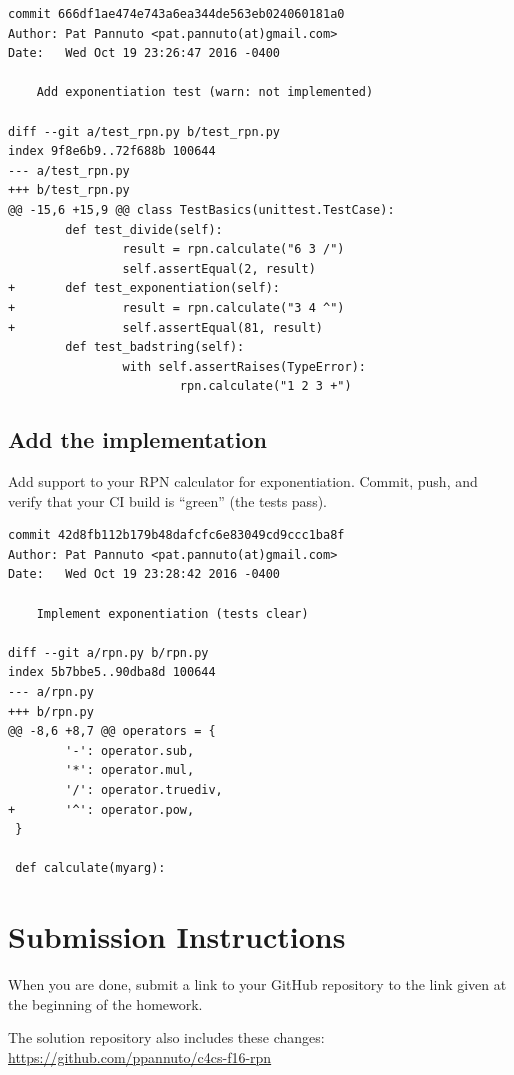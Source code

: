 \documentclass{article}
\begin{document}
{\color{violet}
\begin{lstlisting}
commit 666df1ae474e743a6ea344de563eb024060181a0
Author: Pat Pannuto <pat.pannuto(at)gmail.com>
Date:   Wed Oct 19 23:26:47 2016 -0400

    Add exponentiation test (warn: not implemented)

diff --git a/test_rpn.py b/test_rpn.py
index 9f8e6b9..72f688b 100644
--- a/test_rpn.py
+++ b/test_rpn.py
@@ -15,6 +15,9 @@ class TestBasics(unittest.TestCase):
        def test_divide(self):
                result = rpn.calculate("6 3 /")
                self.assertEqual(2, result)
+       def test_exponentiation(self):
+               result = rpn.calculate("3 4 ^")
+               self.assertEqual(81, result)
        def test_badstring(self):
                with self.assertRaises(TypeError):
                        rpn.calculate("1 2 3 +")
\end{lstlisting}
}

\subsection{Add the implementation}
Add support to your RPN calculator for exponentiation. Commit, push,
and verify that your CI build is ``green'' (the tests pass).


{\color{violet}
\begin{lstlisting}
commit 42d8fb112b179b48dafcfc6e83049cd9ccc1ba8f
Author: Pat Pannuto <pat.pannuto(at)gmail.com>
Date:   Wed Oct 19 23:28:42 2016 -0400

    Implement exponentiation (tests clear)

diff --git a/rpn.py b/rpn.py
index 5b7bbe5..90dba8d 100644
--- a/rpn.py
+++ b/rpn.py
@@ -8,6 +8,7 @@ operators = {
        '-': operator.sub,
        '*': operator.mul,
        '/': operator.truediv,
+       '^': operator.pow,
 }

 def calculate(myarg):
\end{lstlisting}
}

\section*{Submission Instructions}
When you are done, submit a link to your GitHub repository to the link given at
the beginning of the homework.

{\color{violet}
  The solution repository also includes these changes:
  \url{https://github.com/ppannuto/c4cs-f16-rpn}
}
\end{document}
